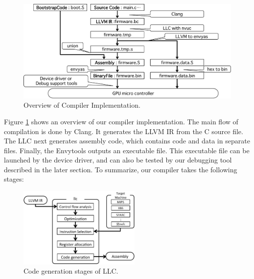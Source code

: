 \begin{figure}[!t]
\begin{center}
\includegraphics[width=12cm]{./img/step_compiler.pdf}
\end{center}
\caption{Overview of Compiler Implementation.}
\label{fig:compiler}
\end{figure}

Figure \ref{fig:compiler} shows an overview of our compiler
implementation.
The main flow of compilation is done by Clang.
It generates the LLVM IR from the C source file.
The LLC next generates assembly code, which contains code and data in
separate files.
Finally, the Envytools outputs an executable file.
This executable file can be launched by the device driver, and can also
be tested by our debugging tool described in the later section.
To summarize, our compiler takes the following stages:

\begin{figure}[!t]
 \begin{center}
  \includegraphics[width=6cm]{./img/llc.pdf}
 \end{center}
 \caption{Code generation stages of LLC.}
 \label{fig:llc}
\end{figure}

